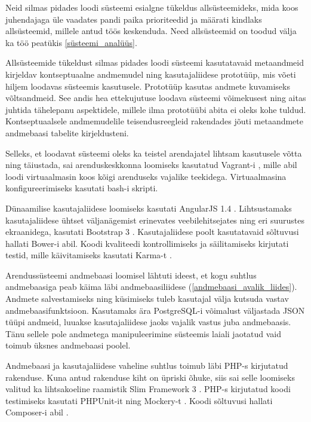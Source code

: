 \documentclass[a4paper,12pt]{article} %
\begin{document}
Neid silmas pidades loodi süsteemi esialgne tükeldus allsüsteemideks, mida koos juhendajaga üle vaadates pandi paika prioriteedid ja määrati kindlaks allsüsteemid, millele antud töös keskenduda. Need allsüsteemid on toodud välja ka töö peatükis \ref{süsteemi_analüüs}.
\par


Allsüsteemide tükeldust silmas pidades loodi süsteemi kasutatavaid metaandmeid kirjeldav kontseptuaalne andmemudel ning kasutajaliidese prototüüp, mis võeti hiljem loodavas süsteemis kasutusele. 
Prototüüp kasutas andmete kuvamiseks võltsandmeid. See andis hea ettekujutuse loodava süsteemi võimekusest ning aitas juhtida tähelepanu aspektidele, millele ilma prototüübi abita ei oleks kohe tuldud. Kontseptuaalsele andmemudelile teisendusreegleid rakendades jõuti metaandmete andmebaasi tabelite kirjeldusteni.\par

Selleks, et loodavat süsteemi oleks ka teistel arendajatel lihtsam kasutusele võtta ning täiustada, sai arenduskeskkonna loomiseks kasutatud Vagrant-i \cite{Vagrant}, mille abil loodi virtuaalmasin koos kõigi arenduseks vajalike teekidega. Virtuaalmasina konfigureerimiseks kasutati bash-i skripti.\par

Dünaamilise kasutajaliidese loomiseks kasutati AngularJS 1.4 \cite{AngularJS}. Lihtsustamaks kasutajaliidese ühtset väljanägemist erinevates veebilehitsejates ning eri suurustes ekraanidega, kasutati Bootstrap 3 \cite{Bootstrap}. Kasutajaliidese poolt kasutatavaid sõltuvusi hallati Bower-i \cite{Bower} abil. Koodi kvaliteedi kontrollimiseks ja säilitamiseks kirjutati testid, mille käivitamiseks kasutati Karma-t \cite{Karma}.\par

Arendussüsteemi andmebaasi loomisel lähtuti ideest, et kogu suhtlus andmebaasiga peab käima läbi andmebaasiliidese (\ref{andmebaasi_avalik_liides}). Andmete salvestamiseks ning küsimiseks tuleb kasutajal välja kutsuda vastav andmebaasifunktsioon. Kasutamaks ära PostgreSQL-i \cite{PostgreSQL} võimalust väljastada JSON tüüpi andmeid, luuakse kasutajaliidese jaoks vajalik vastus juba andmebaasis. Tänu sellele pole andmetega manipuleerimine süsteemis laiali jaotatud vaid toimub üksnes andmebaasi poolel.\par

Andmebaasi ja kasutajaliidese vaheline suhtlus toimub läbi PHP-s \cite{PHP} kirjutatud rakenduse. Kuna antud rakenduse kiht on üpriski õhuke, siis sai selle loomiseks valitud ka lihtsakoeline raamistik Slim Framework 3 \cite{SlimFW}. PHP-s kirjutatud koodi testimiseks kasutati PHPUnit-it \cite{PHPUnit} ning Mockery-t \cite{Mockery}. Koodi sõltuvusi hallati Composer-i abil \cite{Composer}. \par
\end{document}
